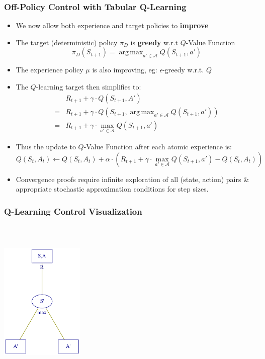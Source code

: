 \documentclass[handout]{beamer}
\DeclareMathOperator*{\argmax}{arg\,max}
\begin{document}
\begin{frame}
\frametitle{Off-Policy Control with Tabular Q-Learning}
\pause
\begin{itemize}[<+->]
\item We now allow both experience and target policies to {\bf improve}
\item The target (deterministic) policy $\pi_D$ is {\bf greedy} w.r.t $Q$-Value Function
$$\pi_D(S_{t+1}) = \argmax_{a' \in \mathcal{A}} Q(S_{t+1}, a')$$
\item The experience policy $\mu$ is also improving, eg: $\epsilon$-greedy w.r.t. $Q$
\item The $Q$-learning target then simplifies to:
\begin{align*}
& R_{t+1} + \gamma \cdot Q(S_{t+1}, A') \\
= & R_{t+1} + \gamma \cdot Q(S_{t+1}, \argmax_{a' \in \mathcal{A}} Q(S_{t+1}, a')) \\
= & R_{t+1} + \gamma \cdot \max_{a' \in \mathcal{A}} Q(S_{t+1}, a')
\end{align*}
\item Thus the update to $Q$-Value Function after each atomic experience is:
$$Q(S_t, A_t) \leftarrow Q(S_t, A_t) + \alpha \cdot (R_{t+1} + \gamma \cdot \max_{a' \in \mathcal{A}} Q(S_{t+1}, a') - Q(S_t, A_t))$$
\item Convergence proofs require infinite exploration of all (state, action) pairs \& appropriate stochastic approximation conditions for step sizes.
\end{itemize}
\end{frame}


\begin{frame}
\frametitle{Q-Learning Control Visualization}
\centerline{\includegraphics[width=4cm, height=8cm]{q_learning.png}}
\end{frame}
\end{document}

